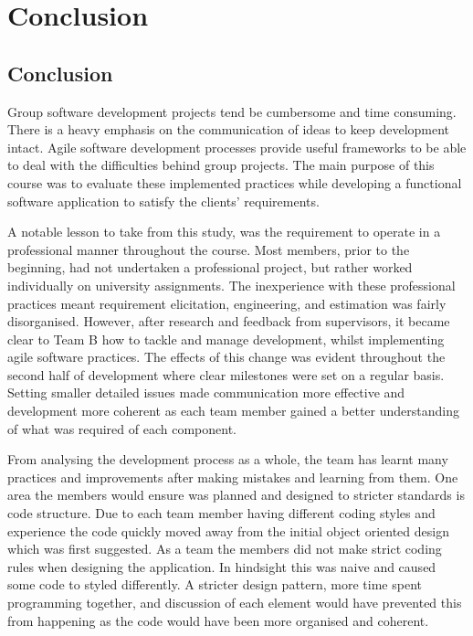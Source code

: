 \documentclass{l3proj}
\begin{document}
\section{Conclusion}
\label{sec:conclusion}
\subsection{Conclusion}
Group software development projects tend be cumbersome and time consuming. There is a heavy emphasis on the communication of ideas to keep development intact. Agile software development processes provide useful frameworks to be able to deal with the difficulties behind group projects. The main purpose of this course was to evaluate these implemented practices while developing a functional software application to satisfy the clients' requirements.

A notable lesson to take from this study, was the requirement to operate in a  professional manner throughout the course. Most members, prior to the beginning, had not undertaken a professional project, but rather worked individually on university assignments. The inexperience with these professional practices meant requirement elicitation, engineering, and estimation was fairly disorganised. However, after research and feedback from supervisors, it became clear to Team B how to tackle and manage development, whilst implementing agile software practices. The effects of this change was evident throughout the second half of development where clear milestones were set on a regular basis. Setting smaller detailed issues made communication more effective and development more coherent as each team member gained a better understanding of what was required of each component.

From analysing the development process as a whole, the team has learnt many practices and improvements after making mistakes and learning from them. One area the members would ensure was planned and designed to stricter standards is code structure. Due to each team member having different coding styles and experience the code quickly moved away from the initial object oriented design which was first suggested. As a team the members did not make strict coding rules when designing the application. In hindsight this was naive and caused some code to styled differently. A stricter design pattern, more time spent programming together, and discussion of each element would have prevented this from happening as the code would have been more organised and coherent.
\end{document}
